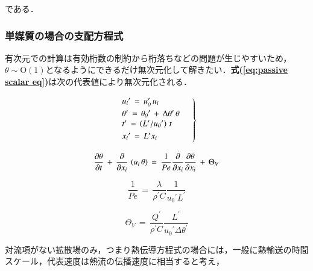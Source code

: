 である．

%
\subsubsection{単媒質の場合の支配方程式}
有次元での計算は有効桁数の制約から桁落ちなどの問題が生じやすいため，$\theta \sim \mathrm{O}(1)$となるようにできるだけ無次元化して解きたい．\textbf{式(\ref{eq:passive scalar eq})}は次の代表値により無次元化される．

\begin{equation}
\left.{\begin{array}{l}
\vspace{1mm}
{u_{i}}^{\prime} \, = \,u_{\mathit{0}}^{\prime}\, u_{i}\\
\theta^{\prime} \, =\, {\theta_{\mathit{0}}}^{\prime} \,+\, \Delta \theta^{\prime} \, \theta\\
\vspace{1mm}
t^{\prime}\, =\, \left( {L}^{\prime} / {u_{\mathit{0}}}^{\prime} \right)\,t\\
\vspace{1mm}
{x_{i}}^{\prime} \, = \, L^{\prime} {x_{i}}
\end{array} \quad }\right\}
\label{eq:representative parameters}
\end{equation}

\begin{equation}
\frac{\mathrm{\partial}\mathit{\theta}}{\mathrm{\partial}{t}} \,+\, \frac{\mathrm{\partial}}{\mathrm{\partial}{x}_{i}}\hspace{0.15em}\left({{u}_{i} \hspace{0.15em} \mathit{\theta}}\right)
\, =\,
\frac{1}{Pe}\frac{\mathrm{\partial}}{\mathrm{\partial}{x}_{i}}\frac{\mathrm{\partial}\mathit{\theta}}{\mathrm{\partial}{x}_{i}} \,+\, {\mathrm{\Theta}}_{V}
\label{eq:passive scalar1 ND}
\end{equation}

\begin{equation}
\frac{1}{Pe} \,=\, \frac{\lambda}{\rho^{\prime} C} \frac{1}{{u_{\mathit{0}}}^{\prime} L^{\prime}}
\label{eq:passive scalar1-1 ND}
\end{equation}

\begin{equation}
\Theta_{V} \,=\, \frac{Q^{\prime}}{\rho^{\prime} C} \frac{L^{\prime}}{{u_{\mathit{0}}}^{\prime} \Delta \theta^{\prime}}
\label{eq:passive scalar1-2 ND}
\end{equation}

\noindent 対流項がない拡散場のみ，つまり熱伝導方程式の場合には，一般に熱輸送の時間スケール，代表速度は熱流の伝播速度に相当すると考え，


